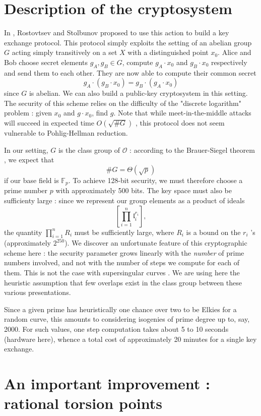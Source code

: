 \documentclass[12pt]{article}
\newcommand{\F}{\mathbb{F}}
\renewcommand{\frak}{\mathfrak}
\renewcommand{\O}{\mathcal{O}}
\begin{document}
\section{Description of the cryptosystem}

In \cite{RS}, Rostovtsev and Stolbunov proposed to use this action to build a key exchange protocol. This protocol simply exploits the setting of an abelian group $G$ acting simply transitively on a set $X$ with a distinguished point $x_0$. Alice and Bob choose secret elements $g_A, g_B\in G$, compute $g_A\cdot x_0$ and $g_B\cdot x_0$ respectively and send them to each other. They are now able to compute their common secret
$$g_A \cdot (g_B \cdot x_0) = g_B \cdot(g_A \cdot x_0)$$
since $G$ is abelian. We can also build a public-key cryptosystem in this setting. The security of this scheme relies on the difficulty of the "discrete logarithm" problem : given $x_0$ and $g\cdot x_0$, find $g$. Note that while meet-in-the-middle attacks will succeed in expected time $O(\sqrt{\#G})$ \cite{?}, this protocol does not seem vulnerable to Pohlig-Hellman reduction.

In our setting, $G$ is the class group of $\O$ : according to the Brauer-Siegel theorem \cite{}, we expect that
$$\#G = \Theta(\sqrt{p})$$
if our base field is $\F_p$. To achieve 128-bit security, we must therefore choose a prime number $p$ with approximately 500 bits. The key space must also be sufficienty large : since we represent our group elements as a product of ideals
$$\left[ \prod_{i = 1}^n {\frak l}_i^{r_i}\right],$$
the quantity $\prod_{i = 1}^n R_i$ must be sufficiently large, where $R_i$ is a bound on the $r_i$ 's (approximately $2^{250}$). We discover an unfortunate feature of this cryptographic scheme here : the security parameter grows linearly with the \emph{number} of prime numbers involved, and not with the number of steps we compute for each of them. This is not the case with supersingular curves \cite{SIDH}. We are using here the heuristic assumption that few overlaps exist in the class group between these various presentations.

Since a given prime has heuristically one chance over two to be Elkies for a random curve, this amounts to considering isogenies of prime degree up to, say, 2000. For such values, one step computation takes about 5 to 10 seconds (hardware here), whence a total cost of approximately 20 minutes for a single key exchange.


\section{An important improvement : rational torsion points}
\end{document}
